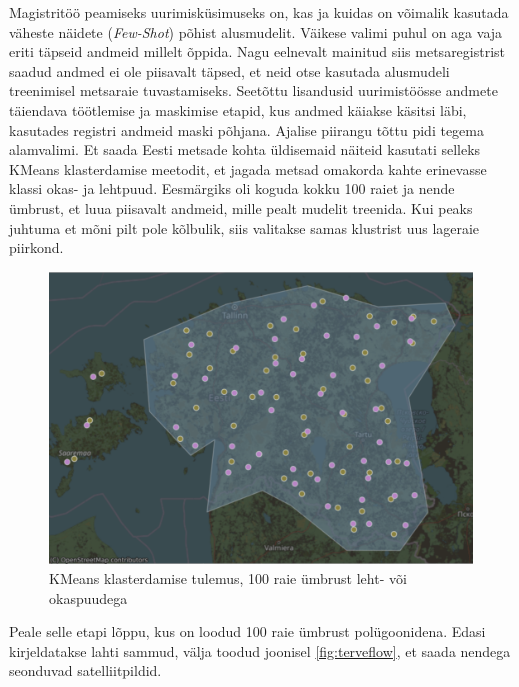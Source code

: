 Magistritöö peamiseks uurimisküsimuseks on, kas ja kuidas on võimalik kasutada väheste näidete (\textit{Few-Shot}) põhist alusmudelit. Väikese valimi puhul on aga vaja eriti täpseid andmeid millelt õppida. Nagu eelnevalt mainitud siis metsaregistrist saadud andmed ei ole piisavalt täpsed, et neid otse kasutada alusmudeli treenimisel metsaraie tuvastamiseks. Seetõttu lisandusid uurimistöösse andmete täiendava töötlemise ja maskimise etapid, kus andmed käiakse käsitsi läbi, kasutades registri andmeid maski põhjana. Ajalise piirangu tõttu pidi tegema alamvalimi. Et saada Eesti metsade kohta üldisemaid näiteid kasutati selleks KMeans klasterdamise meetodit, et jagada metsad omakorda kahte erinevasse klassi okas- ja lehtpuud. Eesmärgiks oli koguda kokku 100 raiet ja nende ümbrust, et luua piisavalt andmeid, mille pealt mudelit treenida. Kui peaks juhtuma et mõni pilt pole kõlbulik, siis valitakse samas klustrist uus lageraie piirkond.

\begin{figure}[H]
    \centering
    \includegraphics[width=.9\textwidth]{figures/andmestik/kmeansmap.png}
    \caption{KMeans klasterdamise tulemus, 100 raie ümbrust leht- või okaspuudega}
    \label{fig:kmeans}
\end{figure}


Peale selle etapi lõppu, kus on loodud 100 raie ümbrust polügoonidena. Edasi kirjeldatakse lahti sammud, välja toodud joonisel \ref{fig:terveflow}, et saada nendega seonduvad satelliitpildid.

